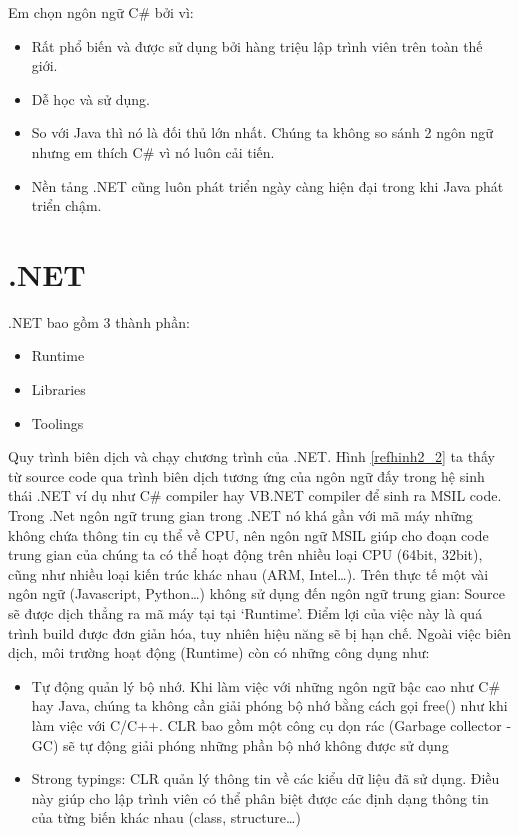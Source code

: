 \par
Em chọn ngôn ngữ C\# bởi vì:
\begin{itemize}
\item Rất phổ biến và được sử dụng bởi hàng triệu lập trình viên trên toàn thế giới.
\item Dễ học và sử dụng.
\item So với Java thì nó là đối thủ lớn nhất. Chúng ta không so sánh 2 ngôn ngữ nhưng em thích C\# vì nó luôn cải tiến.
\item Nền tảng .NET cũng luôn phát triển ngày càng hiện đại trong khi Java phát triển chậm.
\end{itemize}

\section{.NET}
.NET bao gồm 3 thành phần:
\begin{itemize}
\item Runtime
\item Libraries
\item Toolings
\end{itemize}
\par
Quy trình biên dịch và chạy chương trình của .NET. Hình \ref{refhinh2_2} ta thấy từ source code qua trình biên dịch tương ứng của ngôn ngữ đấy trong hệ sinh thái .NET ví dụ như C\# compiler hay VB.NET compiler để sinh ra MSIL code. Trong .Net ngôn ngữ trung gian trong .NET nó khá gần với mã máy những không chứa thông tin cụ thể về CPU, nên ngôn ngữ MSIL giúp cho đoạn code trung gian của chúng ta có thể hoạt động trên nhiều loại CPU (64bit, 32bit), cũng như nhiều loại kiến trúc khác nhau (ARM, Intel…). Trên thực tế một vài ngôn ngữ (Javascript, Python…) không sử dụng đến ngôn ngữ trung gian: Source sẽ được dịch thẳng ra mã máy tại tại ‘Runtime’. Điểm lợi của việc này là quá trình build được đơn giản hóa, tuy nhiên hiệu năng sẽ bị hạn chế.
Ngoài việc biên dịch, môi trường hoạt động (Runtime) còn có những công dụng như:
\begin{itemize}
\item Tự động quản lý bộ nhớ. Khi làm việc với những ngôn ngữ bậc cao như C\# hay Java, chúng ta không cần  giải phóng bộ nhớ bằng cách gọi free() như khi làm việc với C/C++. CLR bao gồm một công cụ dọn rác (Garbage collector -GC) sẽ tự động giải phóng những phần bộ nhớ không được sử dụng
\item Strong typings: CLR quản lý thông tin về các kiểu dữ liệu đã sử dụng. Điều này giúp cho lập trình viên có thể phân biệt được các định dạng thông tin của từng biến khác nhau (class, structure…)
\end{itemize}
